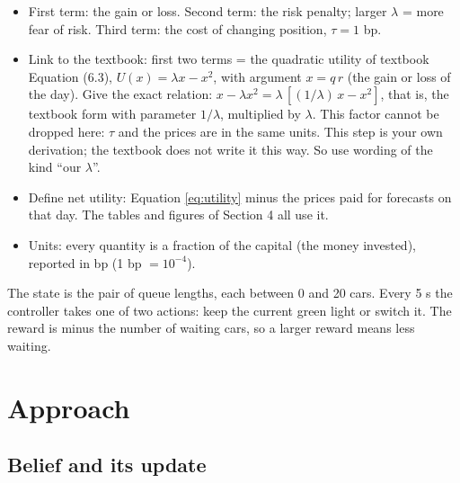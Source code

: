 \documentclass{article}
\newenvironment{pts}{\begin{itemize}[nosep,leftmargin=1.15em,topsep=1pt]}{\end{itemize}}
\begin{document}
\begin{note}
\begin{pts}
\item First term: the gain or loss. Second term: the risk penalty; larger $\lambda$ = more fear of risk. Third term: the cost of changing position, $\tau = 1$ bp.
\item Link to the textbook: first two terms = the quadratic utility of textbook Equation (6.3), $U(x)=\lambda x - x^{2}$, with argument $x = q\,r$ (the gain or loss of the day). Give the exact relation: $x - \lambda x^{2} = \lambda\,[(1/\lambda)\,x - x^{2}]$, that is, the textbook form with parameter $1/\lambda$, multiplied by $\lambda$. This factor cannot be dropped here: $\tau$ and the prices are in the same units. This step is your own derivation; the textbook does not write it this way. So use wording of the kind ``our $\lambda$''.
\item Define net utility: Equation \eqref{eq:utility} minus the prices paid for forecasts on that day. The tables and figures of Section 4 all use it.
\item Units: every quantity is a fraction of the capital (the money invested), reported in bp (1 bp $= 10^{-4}$).
\end{pts}
\end{note}

\begin{model}
The state is the pair of queue lengths, each between 0 and 20 cars. Every 5 s the controller takes one of two actions: keep the current green light or switch it. The reward is minus the number of waiting cars, so a larger reward means less waiting.
\end{model}

\section{Approach}

\subsection{Belief and its update}
\end{document}
